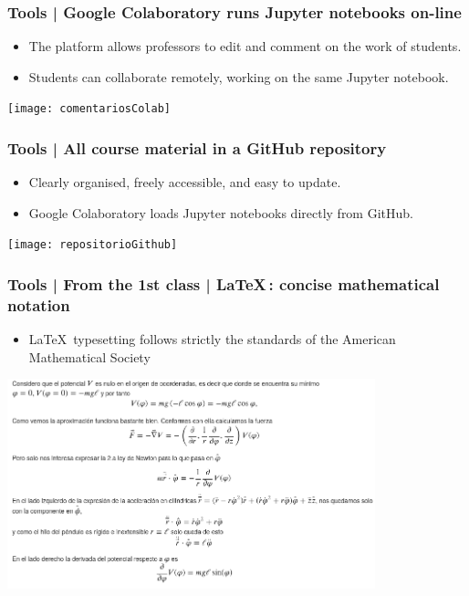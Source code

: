 \documentclass[aspectratio=169]{beamer}
\begin{document}
\begin{frame}
	\frametitle{Tools | Google Colaboratory runs Jupyter notebooks on-line}
	\begin{block}{}
		\begin{itemize}
			\item The platform allows professors to edit and comment on the work of students.
			\item Students can collaborate remotely, working on the same Jupyter notebook.
		\end{itemize}
	\texttt{[image: comentariosColab]}
	\end{block}
\end{frame}


\begin{frame}
	\frametitle{Tools | All course material in a GitHub repository}
	\begin{block}{}
		\begin{itemize}
			\item Clearly organised, freely accessible, and easy to update.
			\item Google Colaboratory loads Jupyter notebooks directly from GitHub.
		\end{itemize}
	\texttt{[image: repositorioGithub]}
	\end{block}
\end{frame}


\begin{frame}
	\frametitle{Tools | From the 1st class | \LaTeX \,: concise mathematical notation}
	\begin{block}{}
		\begin{itemize}
			\item \LaTeX \, typesetting follows strictly the standards of the American Mathematical Society
		\end{itemize}
	\includegraphics[width= 0.8\textwidth]{clase1péndulo}
	\end{block}
\end{frame}
\end{document}
